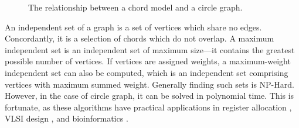 \documentclass[12pt, a4paper]{article}
\begin{document}
\begin{figure}
\begin{center}
\end{center}
\caption{The relationship between a chord model and a circle graph.}
\label{circle2graph}
\end{figure}


An independent set of a graph is a set of vertices which share no edges. Concordantly, it is a selection of chords which do not overlap. A maximum independent set is an independent set of maximum size---it contains the greatest possible number of vertices. If vertices are assigned weights, a maximum-weight independent set can also be computed, which is an independent set comprising vertices with maximum summed weight. Generally finding such sets is NP-Hard. However, in the case of circle graph, it can be solved in polynomial time. This is fortunate, as these algorithms have practical applications in register allocation \cite{de1999graph}, VLSI design \cite{cong1990over}, and bioinformatics \cite{swenson2009maximum}.
\end{document}
